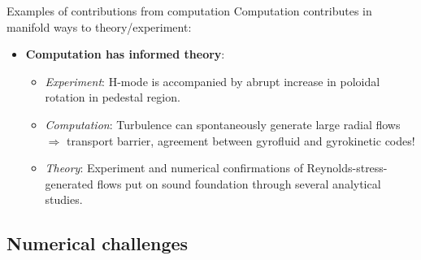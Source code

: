 \documentclass{beamer}
\begin{document}

\begin{frame}{Examples of contributions from computation}
Computation contributes in manifold ways to theory/experiment:
\begin{itemize}
\item \textbf{Computation has informed theory}:
\begin{itemize}
\item \emph{Experiment}: H-mode is accompanied by abrupt increase in poloidal rotation in pedestal region.
\item \emph{Computation}: Turbulence can spontaneously generate large radial flows $\Rightarrow$ transport barrier, agreement between gyrofluid and gyrokinetic codes!
\item \emph{Theory}: Experiment and numerical confirmations of Reynolds-stress-generated flows put on sound foundation through several analytical studies.
\end{itemize}
\end{itemize}


\end{frame}


\subsection{Numerical challenges}
\end{document}
